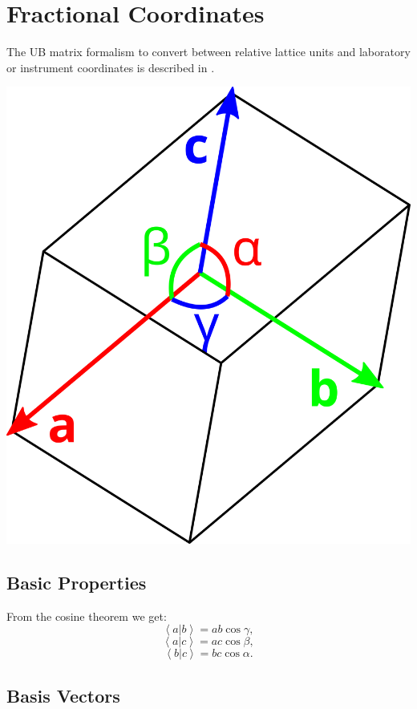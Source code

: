 %
%

\section{Fractional Coordinates}

The UB matrix formalism to convert between relative lattice units and laboratory or instrument coordinates is described in \cite{Lumsden2005}.


\begin{center}
	\includegraphics[width = 0.2 \textwidth]{figures/cell}
\end{center}

\subsection*{Basic Properties}

From the cosine theorem we get:
\begin{equation} \left< a | b \right > = ab \cos \gamma, \label{ab} \end{equation}
\begin{equation} \left< a | c \right > = ac \cos \beta, \label{ac} \end{equation}
\begin{equation} \left< b | c \right > = bc \cos \alpha. \label{bc} \end{equation}


\subsection*{Basis Vectors}

